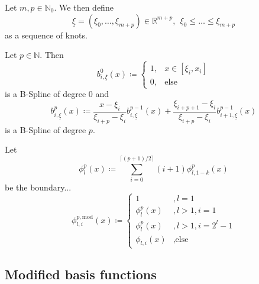 \documentclass[
  a4paper,  %
  twoside,  %
  bibliography=totoc,
  headsepline,
  cleardoublepage=empty,
  parskip=half,
  draft=false
]{scrbook}
\begin{document}
\begin{definition}[Knots]
Let $m,p \in \mathds{N}_0$.
We then define
\begin{equation}
\underline{\xi}=(\xi_0, \dots, \xi_{m + p}) \in \mathds{R}^{m + p}, ~~ \xi_0 \leq \dots \leq \xi_{m + p}
\end{equation}
as a sequence of knots.
\end{definition}

\begin{definition}[B-Splines]
Let $p \in \mathds{N}$.
Then
\begin{equation}
b^0_{i,\underline{\xi}}(x) \coloneqq
\begin{cases}
    1, & x \in [\xi_i,x_i] \\
   0, & \text{else}
\end{cases}
\end{equation}
is a B-Spline of degree $0$ and
\begin{equation}
b_{i,\underline{\xi}}^p(x) \coloneqq \frac{x - \xi_i}{\xi_{i + p} - \xi_i} b_{i,\underline{\xi}}^{p-1}(x) + \frac{\xi_{i+p+1} - \xi_i}{\xi_{i + p} - \xi_i} b_{i+1,\underline{\xi}}^{p-1}(x) 
\end{equation}
is a B-Spline of degree $p$.
\end{definition}

\begin{definition}
Let
\begin{equation}
\phi_l^p(x) \coloneqq \sum_{i=0}^{\lceil (p+1)/2 \rceil} (i+1) \phi^p_{l,1-k}(x)
\end{equation}
be the boundary...
\begin{equation}
\phi^{p,\text{mod}}_{l,i}(x) \coloneqq
\begin{cases}
1 &, l=1\\
\phi^p_{l}(x)&, l>1, i=1\\
\phi^p_{l}(x)&, l>1, i=2^l - 1\\
\phi_{l,i}(x)&, \text{else}
\end{cases}
\nonumber
\end{equation}
\end{definition}


\subsection{Modified basis functions}
\end{document}
